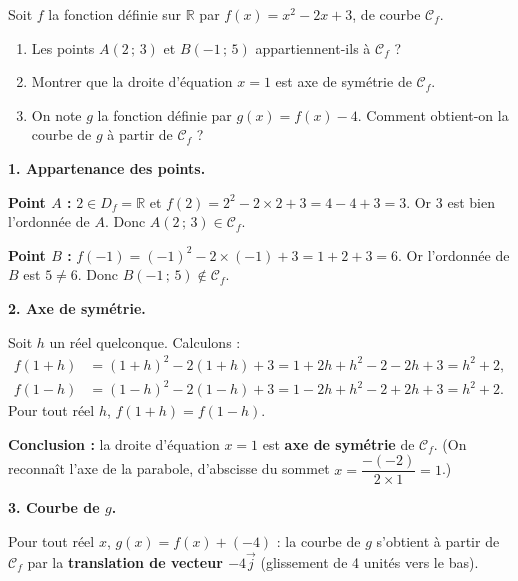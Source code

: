 \documentclass[11pt]{article}
\begin{document}
\begin{exoresolu}
Soit $f$ la fonction définie sur $\mathbb{R}$ par $f(x)=x^2-2x+3$, de courbe $\mathcal{C}_f$.
\begin{enumerate}
\item Les points $A(2\,;\,3)$ et $B(-1\,;\,5)$ appartiennent-ils à $\mathcal{C}_f$ ?
\item Montrer que la droite d'équation $x=1$ est axe de symétrie de $\mathcal{C}_f$.
\item On note $g$ la fonction définie par $g(x)=f(x)-4$. Comment obtient-on la courbe de $g$ à partir de $\mathcal{C}_f$ ?
\end{enumerate}
\tcblower
\textbf{1. Appartenance des points.}

\textbf{Point $A$ :} $2\in D_f=\mathbb{R}$ et $f(2)=2^2-2\times 2+3=4-4+3=3$. Or $3$ est bien l'ordonnée de $A$. Donc $A(2\,;\,3)\in\mathcal{C}_f$.

\textbf{Point $B$ :} $f(-1)=(-1)^2-2\times(-1)+3=1+2+3=6$. Or l'ordonnée de $B$ est $5\neq 6$. Donc $B(-1\,;\,5)\notin\mathcal{C}_f$.

\textbf{2. Axe de symétrie.}

Soit $h$ un réel quelconque. Calculons :
\begin{align*}
f(1+h) &= (1+h)^2-2(1+h)+3 = 1+2h+h^2-2-2h+3 = h^2+2,\\
f(1-h) &= (1-h)^2-2(1-h)+3 = 1-2h+h^2-2+2h+3 = h^2+2.
\end{align*}
Pour tout réel $h$, $f(1+h)=f(1-h)$.

\textbf{Conclusion :} la droite d'équation $x=1$ est \textbf{axe de symétrie} de $\mathcal{C}_f$. (On reconnaît l'axe de la parabole, d'abscisse du sommet $x=\dfrac{-(-2)}{2\times 1}=1$.)

\textbf{3. Courbe de $g$.}

Pour tout réel $x$, $g(x)=f(x)+(-4)$ : la courbe de $g$ s'obtient à partir de $\mathcal{C}_f$ par la \textbf{translation de vecteur $-4\vec{j}$} (glissement de 4 unités vers le bas).
\end{exoresolu}
\end{document}
